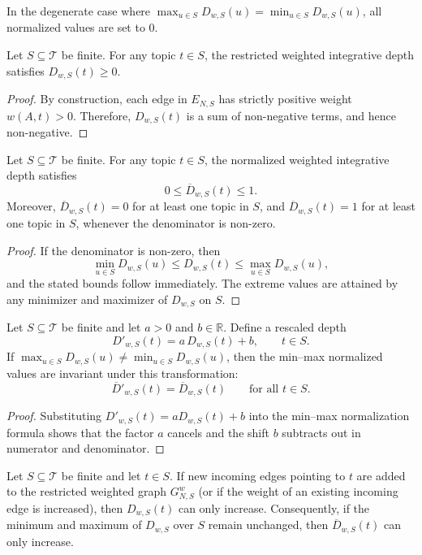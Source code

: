 \noindent
In the degenerate case where $\max_{u \in S} D_{w,S}(u) = \min_{u \in S} D_{w,S}(u)$, all normalized values are set to $0$.

\begin{proposition}
Let $S \subseteq \mathcal{T}$ be finite. For any topic $t \in S$, the restricted weighted integrative depth satisfies $D_{w,S}(t) \ge 0$.
\end{proposition}

\begin{proof}
By construction, each edge in $E_{N,S}$ has strictly positive weight $w(A,t)>0$. Therefore, $D_{w,S}(t)$ is a sum of non-negative terms, and hence non-negative.
\end{proof}

\begin{proposition}
Let $S \subseteq \mathcal{T}$ be finite. For any topic $t \in S$, the normalized weighted integrative depth satisfies
\[
0 \le \overline{D}_{w,S}(t) \le 1.
\]
Moreover, $\overline{D}_{w,S}(t)=0$ for at least one topic in $S$, and $\overline{D}_{w,S}(t)=1$ for at least one topic in $S$, whenever the denominator is non-zero.
\end{proposition}

\begin{proof}
If the denominator is non-zero, then
\[
\min_{u \in S} D_{w,S}(u) \le D_{w,S}(t) \le \max_{u \in S} D_{w,S}(u),
\]
and the stated bounds follow immediately. The extreme values are attained by any minimizer and maximizer of $D_{w,S}$ on $S$.
\end{proof}

\begin{proposition}
Let $S \subseteq \mathcal{T}$ be finite and let $a>0$ and $b\in \mathbb{R}$. Define a rescaled depth
\[
D'_{w,S}(t) = a\,D_{w,S}(t) + b,
\qquad t \in S.
\]
If $\max_{u \in S} D_{w,S}(u) \neq \min_{u \in S} D_{w,S}(u)$, then the min--max normalized values are invariant under this transformation:
\[
\overline{D}'_{w,S}(t) = \overline{D}_{w,S}(t)
\qquad \text{for all } t\in S.
\]
\end{proposition}

\begin{proof}
Substituting $D'_{w,S}(t)=aD_{w,S}(t)+b$ into the min--max normalization formula shows that the factor $a$ cancels and the shift $b$ subtracts out in numerator and denominator.
\end{proof}

\begin{proposition}
Let $S \subseteq \mathcal{T}$ be finite and let $t \in S$. If new incoming edges pointing to $t$ are added to the restricted weighted graph $G_{N,S}^w$ (or if the weight of an existing incoming edge is increased), then $D_{w,S}(t)$ can only increase. Consequently, if the minimum and maximum of $D_{w,S}$ over $S$ remain unchanged, then $\overline{D}_{w,S}(t)$ can only increase.
\end{proposition}

